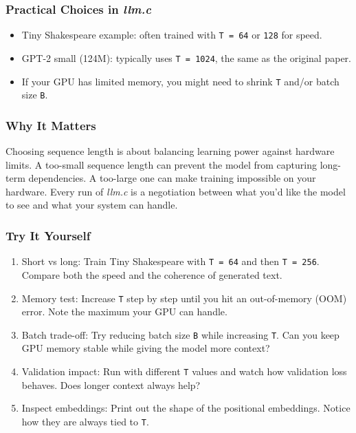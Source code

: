 \documentclass[
  letterpaper,
  DIV=11,
  numbers=noendperiod]{scrreprt}
\providecommand{\tightlist}{%
  \setlength{\itemsep}{0pt}\setlength{\parskip}{0pt}}
\begin{document}
\subsubsection{\texorpdfstring{Practical Choices in
\emph{llm.c}}{Practical Choices in llm.c}}\label{practical-choices-in-llm.c}

\begin{itemize}
\tightlist
\item
  Tiny Shakespeare example: often trained with \texttt{T\ =\ 64} or
  \texttt{128} for speed.
\item
  GPT-2 small (124M): typically uses \texttt{T\ =\ 1024}, the same as
  the original paper.
\item
  If your GPU has limited memory, you might need to shrink \texttt{T}
  and/or batch size \texttt{B}.
\end{itemize}

\subsubsection{Why It Matters}\label{why-it-matters-5}

Choosing sequence length is about balancing learning power against
hardware limits. A too-small sequence length can prevent the model from
capturing long-term dependencies. A too-large one can make training
impossible on your hardware. Every run of \emph{llm.c} is a negotiation
between what you'd like the model to see and what your system can
handle.

\subsubsection{Try It Yourself}\label{try-it-yourself-5}

\begin{enumerate}
\def\labelenumi{\arabic{enumi}.}
\tightlist
\item
  Short vs long: Train Tiny Shakespeare with \texttt{T\ =\ 64} and then
  \texttt{T\ =\ 256}. Compare both the speed and the coherence of
  generated text.
\item
  Memory test: Increase \texttt{T} step by step until you hit an
  out-of-memory (OOM) error. Note the maximum your GPU can handle.
\item
  Batch trade-off: Try reducing batch size \texttt{B} while increasing
  \texttt{T}. Can you keep GPU memory stable while giving the model more
  context?
\item
  Validation impact: Run with different \texttt{T} values and watch how
  validation loss behaves. Does longer context always help?
\item
  Inspect embeddings: Print out the shape of the positional embeddings.
  Notice how they are always tied to \texttt{T}.
\end{enumerate}
\end{document}
